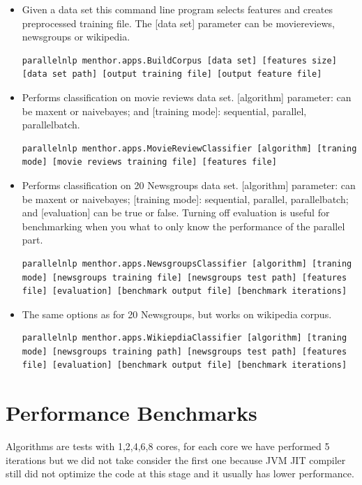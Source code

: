 \documentclass{report}
\begin{document}
\begin{itemize}

\item Given a data set this command line program selects features and creates preprocessed training file. The [data set] parameter can be moviereviews, newsgroups or wikipedia. 
\begin{lstlisting}
parallelnlp menthor.apps.BuildCorpus [data set] [features size] [data set path] [output training file] [output feature file]
\end{lstlisting}

\item Performs classification on movie reviews data set. [algorithm] parameter: can be maxent or naivebayes; and [training mode]: sequential, parallel, parallelbatch.
\begin{lstlisting}
parallelnlp menthor.apps.MovieReviewClassifier [algorithm] [traning mode] [movie reviews training file] [features file]
\end{lstlisting}

\item Performs classification on 20 Newsgroups data set. [algorithm] parameter: can be maxent or naivebayes;  [training mode]: sequential, parallel, parallelbatch; and [evaluation] can be true or false. Turning off evaluation is useful for benchmarking when you what to only know the performance of the parallel part.
\begin{lstlisting}
parallelnlp menthor.apps.NewsgroupsClassifier [algorithm] [traning mode] [newsgroups training file] [newsgroups test path] [features file] [evaluation] [benchmark output file] [benchmark iterations]
\end{lstlisting}

\item The same options as for 20 Newsgroups, but works on wikipedia corpus.
\begin{lstlisting}
parallelnlp menthor.apps.WikiepdiaClassifier [algorithm] [traning mode] [newsgroups training path] [newsgroups test path] [features file] [evaluation] [benchmark output file] [benchmark iterations]
\end{lstlisting}

\end{itemize}

\section{Performance Benchmarks}

Algorithms are tests with 1,2,4,6,8 cores, for each core we have performed 5 iterations but we did not take consider the first one because JVM JIT compiler still did not optimize the code at this stage and it usually has lower performance.
\end{document}
